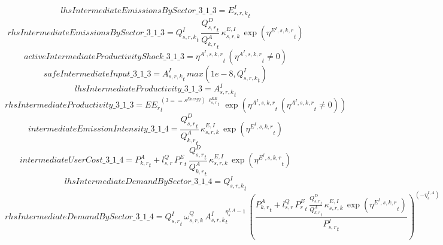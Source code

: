 \begin{dmath*}
lhsIntermediateEmissionsBySector\_3\_1\_3 = {{E^I_{s,r,k}}}_{t}
\end{dmath*}
\begin{dmath*}
rhsIntermediateEmissionsBySector\_3\_1\_3 = {{Q^{I}_{s,r,k}}}_{t}\, \frac{{{Q^{D}_{s,r}}}_{t}}{{{Q^{A}_{k,r}}}_{t}}\, {{\kappa^{E,I}_{s,r,k}}}\, \exp\left({{\eta^{E^{I},s,k,r}}}_{t}\right)
\end{dmath*}
\begin{dmath*}
activeIntermediateProductivityShock\_3\_1\_3 = {{\eta^{A^{I},s,k,r}}}_{t}\, \left({{\eta^{A^{I},s,k,r}}}_{t}\neq 0\right)
\end{dmath*}
\begin{dmath*}
safeIntermediateInput\_3\_1\_3 = {{A^{I}_{s,r,k}}}_{t}\, max(1e-8,{{Q^{I}_{s,r,k}}}_{t})
\end{dmath*}
\begin{dmath*}
lhsIntermediateProductivity\_3\_1\_3 = {{A^{I}_{s,r,k}}}_{t}
\end{dmath*}
\begin{dmath*}
rhsIntermediateProductivity\_3\_1\_3 = {{EE_r}}_{t}^{\left(3=={{s^{Energy}}}\right)\, {{\ell^{EE}_{s,r}}}_{t}}\, \exp\left({{\eta^{A^{I},s,k,r}}}_{t}\, \left({{\eta^{A^{I},s,k,r}}}_{t}\neq 0\right)\right)
\end{dmath*}
\begin{dmath*}
intermediateEmissionIntensity\_3\_1\_4 = \frac{{{Q^{D}_{s,r}}}_{t}}{{{Q^{A}_{k,r}}}_{t}}\, {{\kappa^{E,I}_{s,r,k}}}\, \exp\left({{\eta^{E^{I},s,k,r}}}_{t}\right)
\end{dmath*}
\begin{dmath*}
intermediateUserCost\_3\_1\_4 = {{P^{A}_{k,r}}}_{t}+{{l^{Q}_{s,r}}}\, {{P^E_r}}_{t}\, \frac{{{Q^{D}_{s,r}}}_{t}}{{{Q^{A}_{k,r}}}_{t}}\, {{\kappa^{E,I}_{s,r,k}}}\, \exp\left({{\eta^{E^{I},s,k,r}}}_{t}\right)
\end{dmath*}
\begin{dmath*}
lhsIntermediateDemandBySector\_3\_1\_4 = {{Q^{I}_{s,r,k}}}_{t}
\end{dmath*}
\begin{dmath*}
rhsIntermediateDemandBySector\_3\_1\_4 = {{Q^{I}_{s,r}}}_{t}\, {{\omega^{Q}_{s,r,k}}}\, {{A^{I}_{s,r,k}}}_{t}^{{{\eta^{I,A}_{s}}}-1}\, \left(\frac{{{P^{A}_{k,r}}}_{t}+{{l^{Q}_{s,r}}}\, {{P^E_r}}_{t}\, \frac{{{Q^{D}_{s,r}}}_{t}}{{{Q^{A}_{k,r}}}_{t}}\, {{\kappa^{E,I}_{s,r,k}}}\, \exp\left({{\eta^{E^{I},s,k,r}}}_{t}\right)}{{{P^{I}_{s,r}}}_{t}}\right)^{\left(-{{\eta^{I,A}_{s}}}\right)}
\end{dmath*}

